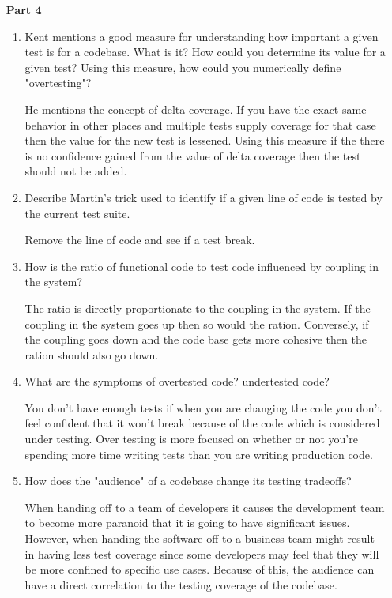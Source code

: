 \begin{enumerate}
\begin{enumerate}
		\end{enumerate}
		
	\item[\bf{Part 4}]
		
		\begin{enumerate}
			\item Kent mentions a good measure for understanding how important a given test is for a codebase. What is it? How could you determine its value for a given test? Using this measure, how could you numerically define "overtesting"?

				He mentions the concept of delta coverage.  If you have the exact same behavior in other places and multiple tests supply coverage for that case then the value for the new test is lessened.  Using this measure if the there is no confidence gained from the value of delta coverage then the test should not be added.

			\item Describe Martin's trick used to identify if a given line of code is tested by the current test suite.

				Remove the line of code and see if a test break.
				

			\item How is the ratio of functional code to test code influenced by coupling in the system?

				 The ratio is directly proportionate to the coupling in the system.  If the coupling in the system goes up then so would the ration.  Conversely, if the coupling goes down and the code base gets more cohesive then the ration should also go down.

			\item What are the symptoms of overtested code? undertested code?

				You don't have enough tests if when you are changing the code you don't feel confident that it won't break because of the code which is considered under testing.  Over testing is more focused on whether or not you're spending more time writing tests than you are writing production code.

			\item How does the "audience" of a codebase change its testing tradeoffs?

				When handing off to a team of developers it causes the development team to become more paranoid that it is going to have significant issues.  However, when handing the software off to a business team might result in having less test coverage since some developers may feel that they will be more confined to specific use cases.  Because of this, the audience can have a direct correlation to the testing coverage of the codebase.


\end{enumerate}
\end{enumerate}
